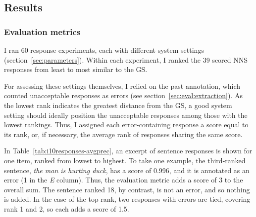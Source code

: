 \subsection{Results}

\subsubsection{Evaluation metrics}
\label{sec:metrics}

I ran 60 response experiments, each with different system settings
(section~\ref{sec:parameters}). Within each experiment, I ranked the 39
scored NNS responses from least to most similar to the GS.

For assessing these settings themselves, I relied on the past annotation,
which counted unacceptable responses as errors (see
section~\ref{sec:eval:extraction}).  As the
lowest rank indicates the greatest distance from the GS, a good system
setting should ideally position the unacceptable responses among those
with the lowest rankings. Thus, I assigned each error-containing
response a score equal to its rank, or, if necessary, the average rank
of responses sharing the same score.

In Table~\ref{tab:i10responses-avgprec}, an excerpt of sentence
responses is shown for one item, ranked from lowest to highest.  To
take one example, the third-ranked sentence, \textit{the man is hurting duck}, has a score of 0.996, and it is annotated as an error (1 in
the \textit{E} column).  Thus, the evaluation metric adds a score of 3
to the overall sum.  The sentence ranked 18, by contrast, is not an
error, and so nothing is added.  In the case of the top rank, two
responses with errors are tied, covering rank 1 and 2, so each adds a score of 1.5.

